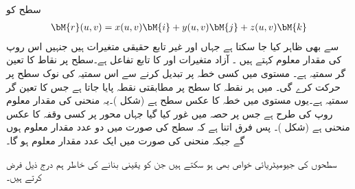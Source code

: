 سطح  کو 
\begin{align}\label{مساوات_خطی_تکمل_سطح_مقدار_معلوم_روپ}
\bM{r}(u,v)=x(u,v)\bM{i}+y(u,v)\bM{j}+z(u,v)\bM{k}
\end{align}
سے بھی ظاہر کیا جا سکتا ہے جہاں  اور  غیر تابع حقیقی متغیرات ہیں جنہیں اس روپ کی مقدار معلوم کہتے ہیں ۔  آزاد متغیرات  اور  کا تابع تفاعل  ہے۔سطح  پر نقاط کا تعین گر سمتیہ  ہے۔ مستوی  میں کسی خطہ  پر  تبدیل کرنے سے اس سمتیہ کی نوک سطح  پر حرکت کرے گی۔  میں ہر نقطہ  کا سطح  پر مطابقتی نقطہ پایا جاتا ہے جس کا تعین گر سمتیہ  ہے۔یوں مستوی  میں خطہ  کا عکس سطح   ہے (شکل )۔یہ منحنی  کی مقدار معلوم روپ  کی طرح ہے جس پر حصہ  میں غور کیا گیا جہاں  محور  پر کسی وقفہ کا عکس منحنی  ہے (شکل )۔ پس فرق اتنا ہے کہ سطح کی صورت میں دو عدد مقدار معلوم ہوں گے جبکہ منحنی کی صورت میں ایک عدد مقدار معلوم ہو گا۔

سطحوں کی  جیومیٹریائی خواص بھی ہو سکتے ہیں جن کو یقینی بنانے کی خاطر ہم درج ذیل فرض کرتے ہیں۔

